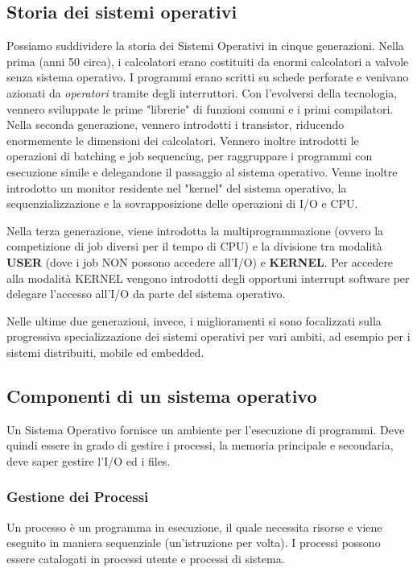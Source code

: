 \documentclass[a4paper]{article}
\begin{document}
\subsection{Storia dei sistemi operativi}

Possiamo suddividere la storia dei Sistemi Operativi in cinque generazioni. Nella prima (anni 50 circa), i calcolatori erano costituiti da enormi calcolatori a valvole senza sistema operativo. I programmi erano scritti su schede perforate e venivano azionati da \textit{operatori} tramite degli interruttori. Con l'evolversi della tecnologia, vennero sviluppate le prime "librerie" di funzioni comuni e i primi compilatori. Nella seconda generazione, vennero introdotti i transistor, riducendo enormemente le dimensioni dei calcolatori. Vennero inoltre introdotti le operazioni di batching e job sequencing, per raggruppare i programmi con esecuzione simile e delegandone il passaggio al sistema operativo. Venne inoltre introdotto un monitor residente nel "kernel" del sistema operativo, la sequenzializzazione e la sovrapposizione delle operazioni di I/O e CPU.

Nella terza generazione, viene introdotta la multiprogrammazione (ovvero la competizione di job diversi per il tempo di CPU) e la divisione tra modalità \textbf{USER} (dove i job NON possono accedere all'I/O) e \textbf{KERNEL}. Per accedere alla modalità KERNEL vengono introdotti degli opportuni interrupt software per delegare l'accesso all'I/O da parte del sistema operativo.

Nelle ultime due generazioni, invece, i miglioramenti si sono focalizzati sulla progressiva specializzazione dei sistemi operativi per vari ambiti, ad esempio per i sistemi distribuiti, mobile ed embedded.

\subsection{Componenti di un sistema operativo}
Un Sistema Operativo fornisce un ambiente per l'esecuzione di programmi. Deve quindi essere in grado di gestire i processi, la memoria principale e secondaria, deve saper gestire l'I/O ed i files.

\subsubsection{Gestione dei Processi}
Un processo è un programma in esecuzione, il quale necessita risorse e viene eseguito in maniera sequenziale (un'istruzione per volta). I processi possono essere catalogati in processi utente e processi di sistema.
\end{document}

